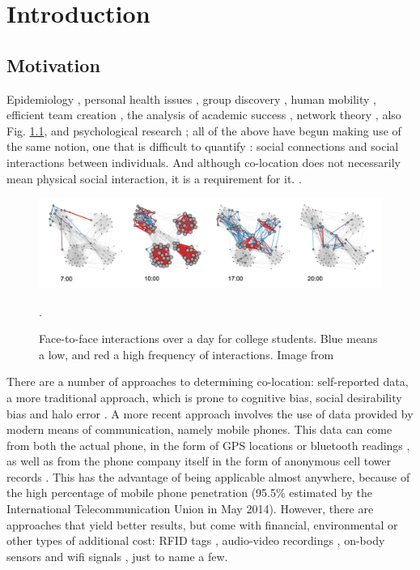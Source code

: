 \chapter{Introduction}

\section{Motivation}



Epidemiology \cite{human_sex}, personal health issues \cite{Madan}, group discovery \cite{5591535}, human mobility \cite{Sun2011929,sevtsuk}, efficient team creation \cite{ECTA, Pentland}, the analysis of academic success \cite{academics}, network theory \cite{networks}, also Fig. \ref{pic:dynamicsf2f}, and psychological research \cite{Rachuri}; all of the above have begun making use of the same notion, one that is difficult to quantify \cite{quant, Wilson}: social connections and social interactions between individuals. And although co-location does not necessarily mean physical social interaction, it is a requirement for it. \cite{Eagle08092009}.

\begin{figure}[h]
	\includegraphics[scale=0.35]{figures/dynamicsf2f.png}
	\caption{Face-to-face interactions over a day for college students. Blue means a low, and red a high frequency of interactions. Image from \protect\cite{Stopczynski}}.
	\label{pic:dynamicsf2f}

\end{figure} 

There are a number of approaches to determining co-location: self-reported data, a more traditional approach, which is prone to cognitive bias, social desirability bias and halo error \cite{Wuchty08092009,gonyea}. A more recent approach involves the use of data provided by modern means of communication, namely mobile phones. This data can come from both the actual phone, in the form of GPS locations or bluetooth readings \cite{Stopczynski}, as well as from the phone company itself in the form of anonymous cell tower records \cite{Onnela01052007, hovel}. This has the advantage of being applicable almost anywhere, because of the high percentage of mobile phone penetration (95.5\% estimated by the International Telecommunication Union in May 2014). 
However, there are approaches that yield better results, but come with financial, environmental or other types of additional cost: RFID tags \cite{catt}, audio-video recordings \cite{audiovideo}, on-body sensors \cite{onbody} and wifi signals \cite{wifi}, just to name a few. 
 
